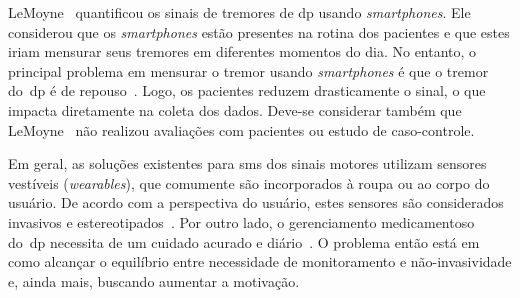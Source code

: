 LeMoyne~\cite{lemoyne2010} quantificou os sinais de tremores de \ac{dp} usando \textit{smartphones}. Ele considerou que os \textit{smartphones} estão presentes na rotina dos pacientes e que estes iriam mensurar seus tremores em diferentes momentos do dia. No entanto, o principal problema em mensurar o tremor usando \textit{smartphones} é que o tremor do~\ac{dp} é de repouso~\cite{jankovic2008}. Logo, os pacientes reduzem drasticamente o sinal, o que impacta diretamente na coleta dos dados. Deve-se considerar também que LeMoyne~\cite{lemoyne2010} não realizou avaliações com pacientes ou estudo de caso-controle. 





Em geral, as soluções existentes para \ac{sms} dos sinais motores utilizam sensores vestíveis (\textit{wearables}), que comumente são incorporados à roupa ou ao corpo do usuário. De acordo com a perspectiva do usuário, estes sensores são considerados invasivos e estereotipados~\cite{aarhus_negotiating_2010}. Por outro lado, o gerenciamento medicamentoso do~\ac{dp} necessita de um cuidado acurado e diário~\cite{quantitativeparkinson2011}. O problema então está em como alcançar o equilíbrio entre necessidade de monitoramento e não-invasividade e, ainda mais, buscando aumentar a motivação.

